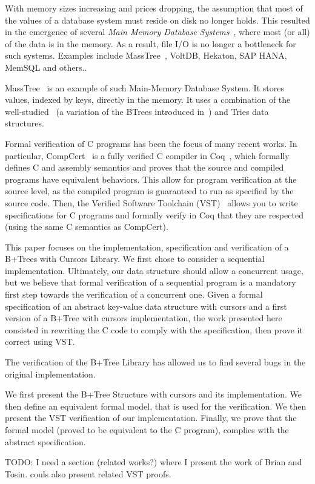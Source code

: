  With memory sizes increasing and prices dropping, the assumption that most of the values of a database system must reside on disk no longer holds.
  This resulted in the emergence of several \textit{Main Memory Database Systems}~\cite{mmdb}, where most (or all) of the data is in the memory.
  As a result, file I/O is no longer a bottleneck for such systems.
  Examples include MassTree~\cite{masstree}, VoltDB, Hekaton, SAP HANA, MemSQL and others..

  MassTree~\cite{masstree} is an example of such Main-Memory Database System.
  It stores values, indexed by keys, directly in the memory.
  It uses a combination of the well-studied \btrees\ (a variation of the BTrees introduced in~\cite{btrees}) and Tries data structures.

  Formal verification of C programs has been the focus of many recent works.
  In particular, CompCert~\cite{compcert,compcert2} is a fully verified C compiler in Coq~\cite{coq}, which formally defines C and assembly semantics and proves that the source and compiled programs have equivalent behaviors.
  This allow for program verification at the source level, as the compiled program is guaranteed to run as specified by the source code.
  Then, the Verified Software Toolchain (VST)~\cite{vst} allows you to write specifications for C programs and formally verify in Coq that they are respected (using the same C semantics as CompCert).

  This paper focuses on the implementation, specification and verification of a B+Trees with Cursors Library. We first chose to consider a sequential implementation.
  Ultimately, our data structure should allow a concurrent usage, but we believe that formal verification of a sequential program is a mandatory first step towards the verification of a concurrent one.
  Given a formal specification of an abstract key-value data structure with cursors and a first version of a B+Tree with cursors implementation, the work presented here consisted in rewriting the C code to comply with the specification, then prove it correct using VST.

  The verification of the B+Tree Library has allowed us to find several bugs in the original implementation.

  We first present the B+Tree Structure with cursors and its implementation.
  We then define an equivalent formal model, that is used for the verification.
  We then present the VST verification of our implementation.
  Finally, we prove that the formal model (proved to be equivalent to the C program), complies with the abstract specification.

TODO: I need a section (related works?) where I present the work of Brian and Tosin. couls also present related VST proofs.
